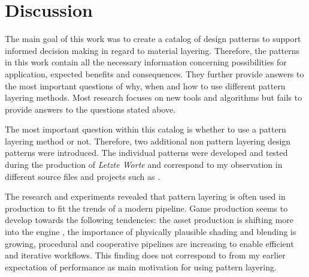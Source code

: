 \chapter{Discussion}\label{cha:discussion}

The main goal of this work was to create a catalog of design patterns to support informed decision making in regard to material layering. Therefore, the patterns in this work contain all the necessary information concerning possibilities for application, expected benefits and consequences. They further provide answers to the most important questions of why, when and how to use different pattern layering methods. Most research focuses on new tools and algorithms \cites{laurent2018efficient, colin2017GearsOfWar, jakob2018labratory} but fails to provide answers to the questions stated above. 

The most important question within this catalog is whether to use a pattern layering method or not. Therefore, two additional non pattern layering design patterns were introduced. The individual patterns were developed and tested during the production of \emph{Letzte Worte} and correspond to my observation in different source files and projects such as \cites{epic2018agora, epic2018chrunch, epic2018soul, epic2018infinity, gears2016coalition, order2015readyatdawns, witcher2015cdproject, paragon2016epic, bookofdead2018, fontainebleu2018}. 

The research and experiments revealed that pattern layering is often used in production to fit the trends of a modern pipeline. Game production seems to develop towards the following tendencies: the asset production is shifting more into the engine \cite{gears2016coalition, paragon2016epic}, the importance of physically plausible shading and blending is growing, procedural and cooperative pipelines are increasing to enable efficient and iterative workflows. This finding does not correspond to from my earlier expectation of performance as main motivation for using pattern layering.  



  
